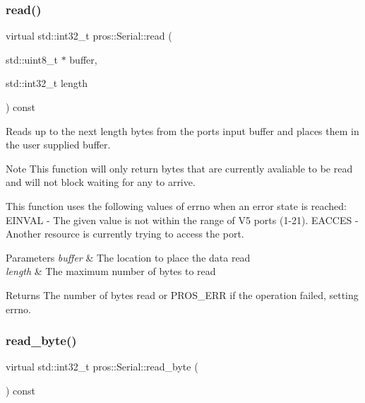 \subsubsection{\texorpdfstring{read()}{read()}}
{\footnotesize\ttfamily virtual std\+::int32\+\_\+t pros\+::\+Serial\+::read (\begin{DoxyParamCaption}\item[{std\+::uint8\+\_\+t $\ast$}]{buffer,  }\item[{std\+::int32\+\_\+t}]{length }\end{DoxyParamCaption}) const\hspace{0.3cm}{\ttfamily [virtual]}}



Reads up to the next length bytes from the port\textquotesingle{}s input buffer and places them in the user supplied buffer. 

\begin{DoxyNote}{Note}
This function will only return bytes that are currently avaliable to be read and will not block waiting for any to arrive.
\end{DoxyNote}
This function uses the following values of errno when an error state is reached\+: E\+I\+N\+V\+AL -\/ The given value is not within the range of V5 ports (1-\/21). E\+A\+C\+C\+ES -\/ Another resource is currently trying to access the port.


\begin{DoxyParams}{Parameters}
{\em buffer} & The location to place the data read \\
\hline
{\em length} & The maximum number of bytes to read\\
\hline
\end{DoxyParams}
\begin{DoxyReturn}{Returns}
The number of bytes read or P\+R\+O\+S\+\_\+\+E\+RR if the operation failed, setting errno. 
\end{DoxyReturn}
\mbox{\label{classpros_1_1Serial_a59c62f236867ec160668389a47d09a5e}} 
\subsubsection{\texorpdfstring{read\+\_\+byte()}{read\_byte()}}
{\footnotesize\ttfamily virtual std\+::int32\+\_\+t pros\+::\+Serial\+::read\+\_\+byte (\begin{DoxyParamCaption}{ }\end{DoxyParamCaption}) const\hspace{0.3cm}{\ttfamily [virtual]}}



